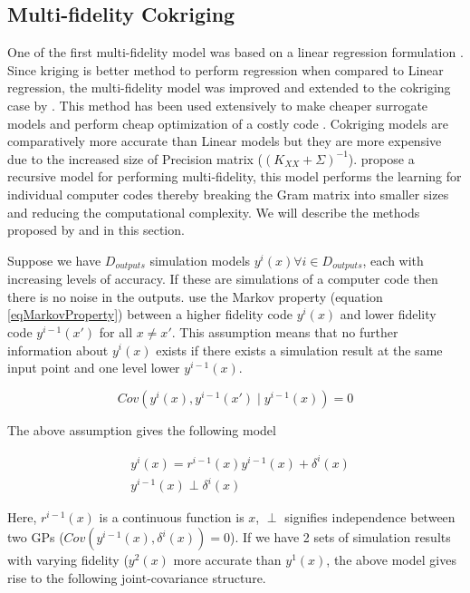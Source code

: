 \subsection{Multi-fidelity Cokriging}\label{secMultiFidelityMTGP}
One of the first multi-fidelity model was based on a linear regression formulation \cite{craig1998constructing, goldstein2007bayes}. Since kriging is better method to perform regression when compared to Linear regression, the multi-fidelity model was improved and extended to the cokriging case by \cite{kennedy2000predicting, o1998markov}. This method has been used extensively to make cheaper surrogate models and perform cheap optimization of a costly code \cite{forrester2007multi, march2012provably}. Cokriging models are comparatively more accurate than Linear models but they are more expensive due to the increased size of Precision matrix ($(K_{XX} + \Sigma)^{-1}$). \cite{le2013multi} propose a recursive model for performing multi-fidelity, this model performs the learning for individual computer codes thereby breaking the Gram matrix into smaller sizes and reducing the computational complexity. We will describe the methods proposed by \cite{o1998markov} and \cite{le2013multi} in this section. 

Suppose we have $D_{outputs}$ simulation models $y^{i}(x) \forall i \in D_{outputs}$, each with increasing levels of accuracy. If these are simulations of a computer code then there is no noise in the outputs. \cite{o1998markov} use the Markov property (equation \ref{eqMarkovProperty}) between a higher fidelity code $y^{i}(x)$ and lower fidelity code $y^{i-1}(x')$ for all $x \neq x'$. This assumption means that no further information about $y^{i}(x)$ exists if there exists a simulation result at the same input point and one level lower $y^{i-1}(x)$. 

\begin{equation}\label{eqMarkovProperty}
         Cov(y^{i}(x), y^{i-1}(x') \mid y^{i-1}(x)) = 0
\end{equation}

The above assumption gives the following model

\begin{align}
  & y^{i}(x) = r^{i-1}(x)y^{i-1}(x) + \delta^{i}(x) \\
  & y^{i-1}(x) \perp \delta^{i}(x)
\end{align}

Here, $r^{i-1}(x)$ is a continuous function is $x$, $\perp$ signifies independence between two GPs ($Cov(y^{i-1}(x), \delta^{i}(x)) = 0$). If we have 2 sets of simulation results with varying fidelity ($y^{2}(x)$ more accurate than $y^{1}(x)$, the above model gives rise to the following joint-covariance structure.

